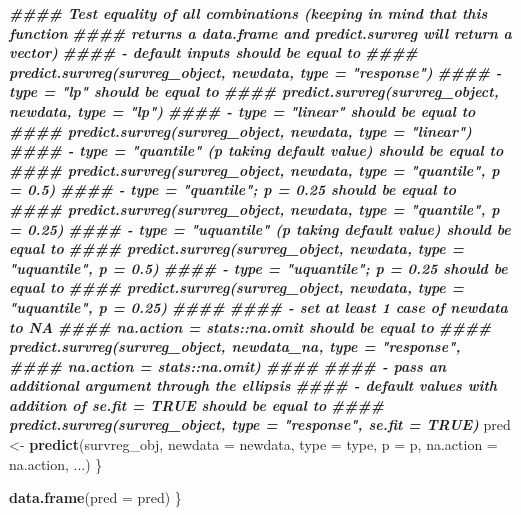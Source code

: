 \documentclass[
]{book}
\newenvironment{Shaded}{\begin{snugshade}}{\end{snugshade}}
\newcommand{\AttributeTok}[1]{\textcolor[rgb]{0.13,0.29,0.53}{#1}}
\newcommand{\DocumentationTok}[1]{\textcolor[rgb]{0.56,0.35,0.01}{\textbf{\textit{#1}}}}
\newcommand{\FunctionTok}[1]{\textcolor[rgb]{0.13,0.29,0.53}{\textbf{#1}}}
\newcommand{\NormalTok}[1]{#1}
\newcommand{\OtherTok}[1]{\textcolor[rgb]{0.56,0.35,0.01}{#1}}
\begin{document}
\begin{Shaded}
\begin{Highlighting}[]
    \DocumentationTok{\#\#\#\#   Test equality of all combinations (keeping in mind that this function}
    \DocumentationTok{\#\#\#\#    returns a data.frame and predict.survreg will return a vector)}
    \DocumentationTok{\#\#\#\#   {-} default inputs should be equal to}
    \DocumentationTok{\#\#\#\#     predict.survreg(survreg\_object, newdata, type = "response")}
    \DocumentationTok{\#\#\#\#   {-} type = "lp" should be equal to}
    \DocumentationTok{\#\#\#\#     predict.survreg(survreg\_object, newdata, type = "lp")}
    \DocumentationTok{\#\#\#\#   {-} type = "linear" should be equal to}
    \DocumentationTok{\#\#\#\#     predict.survreg(survreg\_object, newdata, type = "linear")}
    \DocumentationTok{\#\#\#\#   {-} type = "quantile" (p taking default value) should be equal to}
    \DocumentationTok{\#\#\#\#     predict.survreg(survreg\_object, newdata, type = "quantile", p = 0.5)}
    \DocumentationTok{\#\#\#\#   {-} type = "quantile"; p = 0.25 should be equal to}
    \DocumentationTok{\#\#\#\#     predict.survreg(survreg\_object, newdata, type = "quantile", p = 0.25)}
    \DocumentationTok{\#\#\#\#   {-} type = "uquantile" (p taking default value) should be equal to}
    \DocumentationTok{\#\#\#\#     predict.survreg(survreg\_object, newdata, type = "uquantile", p = 0.5)}
    \DocumentationTok{\#\#\#\#   {-} type = "uquantile"; p = 0.25 should be equal to}
    \DocumentationTok{\#\#\#\#     predict.survreg(survreg\_object, newdata, type = "uquantile", p = 0.25)}
    \DocumentationTok{\#\#\#\# }
    \DocumentationTok{\#\#\#\#   {-} set at least 1 case of \textasciigrave{}newdata\textasciigrave{} to NA}
    \DocumentationTok{\#\#\#\#     na.action = stats::na.omit should be equal to}
    \DocumentationTok{\#\#\#\#     predict.survreg(survreg\_object, newdata\_na, type = "response", }
    \DocumentationTok{\#\#\#\#                     na.action = stats::na.omit)}
    \DocumentationTok{\#\#\#\#}
    \DocumentationTok{\#\#\#\# {-} pass an additional argument through the ellipsis}
    \DocumentationTok{\#\#\#\#   {-} default values with addition of se.fit = TRUE should be equal to}
    \DocumentationTok{\#\#\#\#   predict.survreg(survreg\_object, type = "response", se.fit = TRUE)}
\NormalTok{    pred }\OtherTok{\textless{}{-}} \FunctionTok{predict}\NormalTok{(survreg\_obj, }\AttributeTok{newdata =}\NormalTok{ newdata, }\AttributeTok{type =}\NormalTok{ type, }\AttributeTok{p =}\NormalTok{ p, }
                    \AttributeTok{na.action =}\NormalTok{ na.action, ...)}
\NormalTok{  \}}

  \FunctionTok{data.frame}\NormalTok{(}\AttributeTok{pred =}\NormalTok{ pred)}
\NormalTok{\}}
\end{Highlighting}
\end{Shaded}
\end{document}
